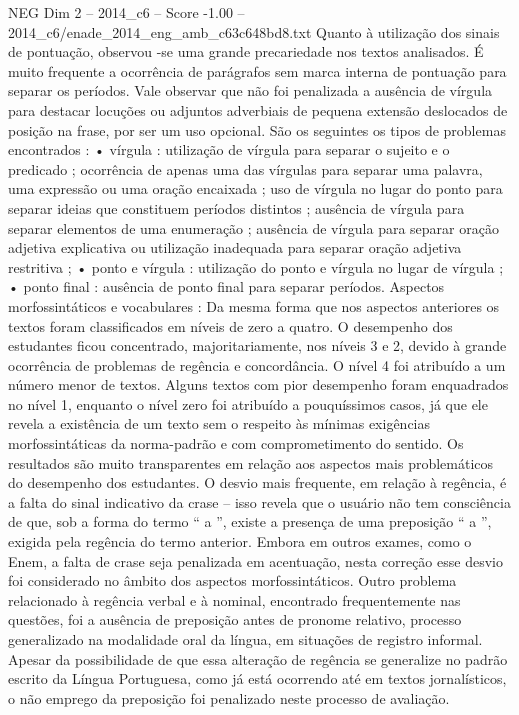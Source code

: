 \begin{textsample}{NEG Dim 2 – 2014\_c6 – Score -1.00 – 2014\_c6/enade\_2014\_eng\_amb\_c63c648bd8.txt}
Quanto à utilização dos sinais de pontuação, observou -se uma grande precariedade nos textos analisados.
É muito frequente a ocorrência de parágrafos sem marca interna de pontuação para separar os períodos.
Vale observar que não foi penalizada a ausência de vírgula para destacar locuções ou adjuntos adverbiais de pequena extensão deslocados de posição na frase, por ser um uso opcional.
São os seguintes os tipos de problemas encontrados : • vírgula : utilização de vírgula para separar o sujeito e o predicado ; ocorrência de apenas uma das vírgulas para separar uma palavra, uma expressão ou uma oração encaixada ; uso de vírgula no lugar do ponto para separar ideias que constituem períodos distintos ; ausência de vírgula para separar elementos de uma enumeração ; ausência de vírgula para separar oração adjetiva explicativa ou utilização inadequada para separar oração adjetiva restritiva ; • ponto e vírgula : utilização do ponto e vírgula no lugar de vírgula ; • ponto final : ausência de ponto final para separar períodos.
Aspectos morfossintáticos e vocabulares : Da mesma forma que nos aspectos anteriores os textos foram classificados em níveis de zero a quatro.
O desempenho dos estudantes ficou concentrado, majoritariamente, nos níveis 3 e 2, devido à grande ocorrência de problemas de regência e concordância.
O nível 4 foi atribuído a um número menor de textos.
Alguns textos com pior desempenho foram enquadrados no nível 1, enquanto o nível zero foi atribuído a pouquíssimos casos, já que ele revela a existência de um texto sem o respeito às mínimas exigências morfossintáticas da norma-padrão e com comprometimento do sentido.
Os resultados são muito transparentes em relação aos aspectos mais problemáticos do desempenho dos estudantes.
O desvio mais frequente, em relação à regência, é a falta do sinal indicativo da crase – isso revela que o usuário não tem consciência de que, sob a forma do termo “ a ”, existe a presença de uma preposição “ a ”, exigida pela regência do termo anterior.
Embora em outros exames, como o Enem, a falta de crase seja penalizada em acentuação, nesta correção esse desvio foi considerado no âmbito dos aspectos morfossintáticos.
Outro problema relacionado à regência verbal e à nominal, encontrado frequentemente nas questões, foi a ausência de preposição antes de pronome relativo, processo generalizado na modalidade oral da língua, em situações de registro informal.
Apesar da possibilidade de que essa alteração de regência se generalize no padrão escrito da Língua Portuguesa, como já está ocorrendo até em textos jornalísticos, o não emprego da preposição foi penalizado neste processo de avaliação.

\end{textsample}
